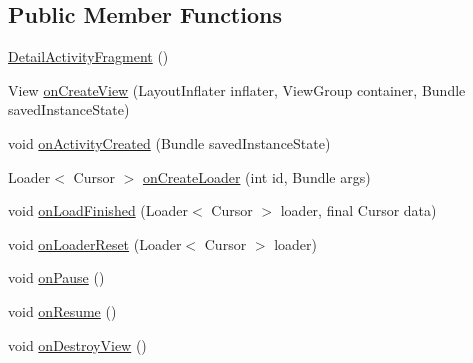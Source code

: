 \subsection*{Public Member Functions}
\begin{DoxyCompactItemize}
\item 
\hyperlink{classorg_1_1buildmlearn_1_1videocollection_1_1fragment_1_1DetailActivityFragment_a144556075d4854c10938b818cdebb7fc}{Detail\+Activity\+Fragment} ()
\item 
View \hyperlink{classorg_1_1buildmlearn_1_1videocollection_1_1fragment_1_1DetailActivityFragment_aef104909cddbd9fb3796f95087ff3256}{on\+Create\+View} (Layout\+Inflater inflater, View\+Group container, Bundle saved\+Instance\+State)
\item 
void \hyperlink{classorg_1_1buildmlearn_1_1videocollection_1_1fragment_1_1DetailActivityFragment_aade2605677483ad05a9e15d01fcbd146}{on\+Activity\+Created} (Bundle saved\+Instance\+State)
\item 
Loader$<$ Cursor $>$ \hyperlink{classorg_1_1buildmlearn_1_1videocollection_1_1fragment_1_1DetailActivityFragment_a88b23632ac271c66fa9c8feb1a78cc1c}{on\+Create\+Loader} (int id, Bundle args)
\item 
void \hyperlink{classorg_1_1buildmlearn_1_1videocollection_1_1fragment_1_1DetailActivityFragment_aa50d1e4a27b6df50806caa79722f23dc}{on\+Load\+Finished} (Loader$<$ Cursor $>$ loader, final Cursor data)
\item 
void \hyperlink{classorg_1_1buildmlearn_1_1videocollection_1_1fragment_1_1DetailActivityFragment_a8aef1f8b6c219dd0d4679b146b628f7d}{on\+Loader\+Reset} (Loader$<$ Cursor $>$ loader)
\item 
void \hyperlink{classorg_1_1buildmlearn_1_1videocollection_1_1fragment_1_1DetailActivityFragment_a3a4b5e80a2adf472c484d0f2712d56ad}{on\+Pause} ()
\item 
void \hyperlink{classorg_1_1buildmlearn_1_1videocollection_1_1fragment_1_1DetailActivityFragment_ad472563a2714a1e57c98305db1554070}{on\+Resume} ()
\item 
void \hyperlink{classorg_1_1buildmlearn_1_1videocollection_1_1fragment_1_1DetailActivityFragment_aba8d42011447c24c04667231ffb21511}{on\+Destroy\+View} ()
\end{DoxyCompactItemize}
